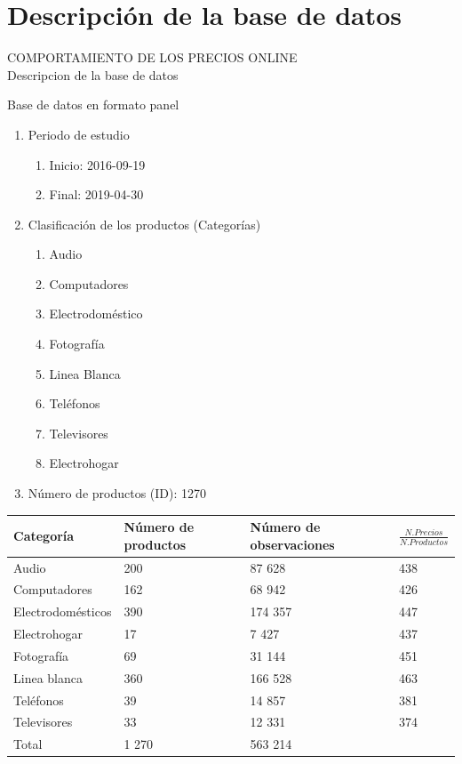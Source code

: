 \documentclass[xcolor=dvipsnames]{beamer}
\begin{document}
\section{Descripci\'on de la base de datos}
\begin{frame}
COMPORTAMIENTO DE LOS PRECIOS ONLINE\\
Descripcion de la base de datos
\end{frame}
\begin{frame}
Base de datos en formato panel
\begin{enumerate}[I]
\item Periodo de estudio
\begin{enumerate}[i]
  \item Inicio: 2016-09-19
  \item Final: 2019-04-30
\end{enumerate}
\item Clasificaci\'on de los productos (Categor\'ias)
\begin{enumerate}[i]
  \item Audio
  \item Computadores
  \item Electrodom\'estico
  \item Fotograf\'ia
  \item Linea Blanca
  \item Tel\'efonos
  \item Televisores
  \item Electrohogar
\end{enumerate}
\item N\'umero de productos (ID): 1270
\end{enumerate}
\end{frame}

\begin{frame}
\centering
\begin{tabular}{m{2.5cm}m{2cm}m{2cm}m{2cm}}
\toprule
Categor\'ia & N\'umero de productos & N\'umero de observaciones & $\frac{N.Precios}{N.Productos}$ \\
\midrule
Audio & 200 &  87 628 & 438\\
Computadores & 162 &  68 942& 426\\
Electrodom\'esticos & 390 & 174 357 & 447\\
Electrohogar & 17 &   7 427& 437\\
Fotograf\'ia & 69 &  31 144& 451\\
\addlinespace
Linea blanca & 360 & 166 528& 463\\
Tel\'efonos & 39 &  14 857& 381\\
Televisores & 33 &  12 331 & 374\\
\midrule
Total & 1 270 & 563 214 & \\
\bottomrule
\end{tabular}
\end{frame}
\end{document}
